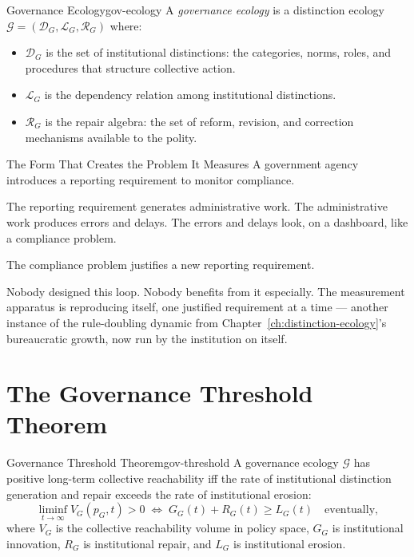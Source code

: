 \documentclass[12pt,twoside,openright]{book}
\begin{document}
\begin{definition}{Governance Ecology}{gov-ecology}
  A \emph{governance ecology} is a distinction ecology
  $\mathcal{G} = (\mathcal{D}_G, \mathcal{L}_G,
  \mathcal{R}_G)$ where:
  \begin{itemize}[nosep]
    \item $\mathcal{D}_G$ is the set of institutional
          distinctions: the categories, norms, roles,
          and procedures that structure collective action.
    \item $\mathcal{L}_G$ is the dependency relation
          among institutional distinctions.
    \item $\mathcal{R}_G$ is the repair algebra:
          the set of reform, revision, and correction
          mechanisms available to the polity.
  \end{itemize}
\end{definition}

\begin{distinctionaside}{The Form That Creates the Problem It
  Measures}
A government agency introduces a reporting requirement to
monitor compliance.

The reporting requirement generates administrative work. The
administrative work produces errors and delays. The errors
and delays look, on a dashboard, like a compliance problem.

The compliance problem justifies a new reporting requirement.

Nobody designed this loop. Nobody benefits from it
especially. The measurement apparatus is reproducing itself,
one justified requirement at a time --- another instance of
the rule-doubling dynamic from Chapter~\ref{ch:distinction-ecology}'s
bureaucratic growth, now run by the institution on itself.
\end{distinctionaside}

\section{The Governance Threshold Theorem}

\begin{theorem}{Governance Threshold Theorem}{gov-threshold}
  A governance ecology $\mathcal{G}$ has positive
  long-term collective reachability iff
  the rate of institutional distinction generation
  and repair exceeds the rate of institutional erosion:
  \[
    \liminf_{t\to\infty}
    V_G(p_G, t) > 0
    \;\iff\;
    G_G(t) + R_G(t) \ge L_G(t)
    \quad \text{eventually},
  \]
  where $V_G$ is the collective reachability volume in
  policy space, $G_G$ is institutional innovation,
  $R_G$ is institutional repair, and $L_G$ is
  institutional erosion.
\end{theorem}
\end{document}
